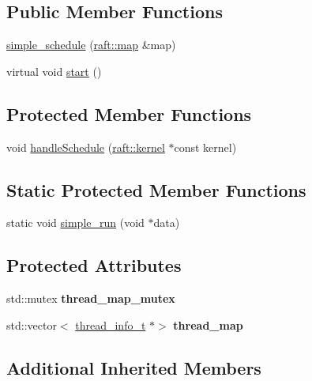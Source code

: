 \subsection*{Public Member Functions}
\begin{DoxyCompactItemize}
\item 
\hyperlink{classsimple__schedule_af67989b8a100e97f549e3dee6847a35c}{simple\+\_\+schedule} (\hyperlink{classraft_1_1map}{raft\+::map} \&map)
\item 
virtual void \hyperlink{classsimple__schedule_ad60a7608111e011d0c04f6ac566cfd8c}{start} ()
\end{DoxyCompactItemize}
\subsection*{Protected Member Functions}
\begin{DoxyCompactItemize}
\item 
void \hyperlink{classsimple__schedule_aafebb0cc13b4539387790ff54ea40830}{handle\+Schedule} (\hyperlink{classraft_1_1kernel}{raft\+::kernel} $\ast$const kernel)
\end{DoxyCompactItemize}
\subsection*{Static Protected Member Functions}
\begin{DoxyCompactItemize}
\item 
static void \hyperlink{classsimple__schedule_a128caa6bacc62c7289bb09f234ef75b7}{simple\+\_\+run} (void $\ast$data)
\end{DoxyCompactItemize}
\subsection*{Protected Attributes}
\begin{DoxyCompactItemize}
\item 
\hypertarget{classsimple__schedule_a2f47cf02f323a32405d17e27746c515d}{}\label{classsimple__schedule_a2f47cf02f323a32405d17e27746c515d} 
std\+::mutex {\bfseries thread\+\_\+map\+\_\+mutex}
\item 
\hypertarget{classsimple__schedule_a1c6f1b93365dc324a72c467765ffef86}{}\label{classsimple__schedule_a1c6f1b93365dc324a72c467765ffef86} 
std\+::vector$<$ \hyperlink{structsimple__schedule_1_1thread__info__t}{thread\+\_\+info\+\_\+t} $\ast$$>$ {\bfseries thread\+\_\+map}
\end{DoxyCompactItemize}
\subsection*{Additional Inherited Members}


